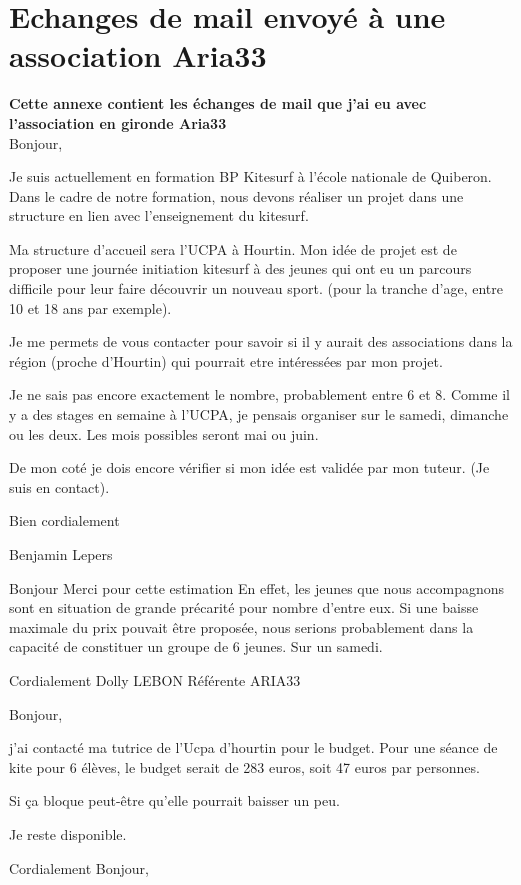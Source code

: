 \documentclass[11pt,a4paper]{report}
\begin{document}
\chapter{Echanges de mail envoyé à une association Aria33}\label{appendix_mail}
\textbf{Cette annexe contient les échanges de mail que j'ai eu avec l'association 
en gironde Aria33\cite{aria33}} \\

Bonjour,

Je suis actuellement en formation BP Kitesurf à l'école nationale de Quiberon.
Dans le cadre de notre formation, nous devons réaliser un projet dans
une structure en lien avec l'enseignement du kitesurf.

Ma structure d'accueil sera l'UCPA à Hourtin.
Mon idée de projet est de proposer une journée initiation kitesurf à
des jeunes qui ont eu un parcours difficile pour leur faire découvrir
un nouveau sport.
(pour la tranche d'age, entre 10 et 18 ans par exemple).

Je me permets de vous contacter pour savoir si il y aurait des
associations dans la région (proche d'Hourtin) qui pourrait etre
intéressées par mon projet.

Je ne sais pas encore exactement le nombre, probablement entre 6 et 8.
Comme il y a des stages en semaine à l'UCPA, je pensais organiser sur
le samedi, dimanche ou les deux. Les mois possibles seront mai ou
juin.

De mon coté je dois encore vérifier si mon idée est validée par mon
tuteur. (Je suis en contact).


Bien cordialement

Benjamin Lepers

\bigskip
Bonjour
Merci pour cette estimation
En effet, les jeunes que nous accompagnons sont en situation de grande
précarité pour nombre d'entre eux. Si une baisse maximale du prix
pouvait être proposée, nous serions probablement dans la capacité
de constituer un groupe de 6 jeunes. Sur un samedi.

Cordialement
Dolly LEBON
Référente ARIA33

\bigskip
Bonjour,

j'ai contacté ma tutrice de l'Ucpa d'hourtin pour le budget.
Pour une séance de kite  pour 6 élèves, le budget serait de 283 euros,
soit 47 euros par personnes.

Si ça bloque peut-être qu'elle pourrait baisser un peu.


Je reste disponible.

Cordialement
\bigskip
Bonjour,
\end{document}
